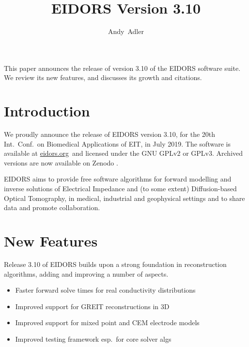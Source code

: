\documentclass[10pt,letterpaper]{article}
\title{EIDORS Version 3.10%
\vspace{-2ex}} %
\author{Andy~Adler}
\affil{Carleton University, Ottawa, Canada}
\date{}
\begin{document}
\maketitle
\vspace{-1.5cm}
\thispagestyle{empty}

\begin{multicols}{2}

This paper announces the release of version 3.10 of the
EIDORS software suite. We review its new features, and 
discusses its growth and citations.

\section{Introduction}
We proudly announce the release of EIDORS version 3.10,
for the 20th Int.\ Conf.\ on Biomedical Applications of EIT,
in July 2019.
The software is available at \href{www.eidors.org}{eidors.org}\, and licensed under the GNU GPLv2 or GPLv3. Archived versions are now available on Zenodo
\cite{eidors3p10}.


EIDORS aims to provide free software algorithms for forward modelling
and inverse solutions
of Electrical Impedance and (to some extent) Diffusion-based Optical Tomography, in
medical, industrial and geophysical settings and to share data and promote
collaboration.

\section{New Features}
Release 3.10 of EIDORS builds upon a strong foundation in reconstruction
algorithms, adding and improving a number of aspects.
\begin{itemize}
\item Faster forward solve times for real conductivity distributions

\item Improved support for GREIT reconstructions in 3D \cite{grychtol2019}

\item Improved support for mixed point and CEM electrode models


\item Improved testing framework esp.\ for core solver algs


\end{itemize}
\end{multicols}
\end{document}
